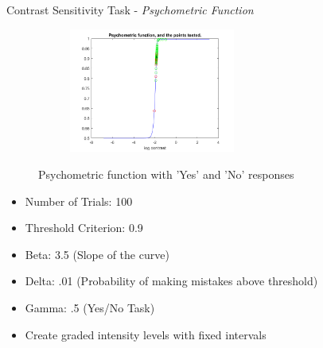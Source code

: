 \documentclass[10pt,xcolor=svgnames]{beamer} %
\begin{document}
\begin{frame}{Contrast Sensitivity Task - \textit{Psychometric Function}}
    \begin{figure}
        \centering
        \begin{figure}
        \centering
            \includegraphics[width=0.6\textwidth]{pictures/thrExp_PC.png}
        \end{figure}
        \hfill
        \label{fig:psychometric_func}
        \vspace{-0.7cm}
        \caption{Psychometric function with 'Yes' and 'No' responses}
    \end{figure}
    \vspace{-0.5cm}
    \begin{itemize}
    \small
        \item Number of Trials:	  100
        \item Threshold Criterion: 0.9
        \item Beta:		  3.5 (Slope of the curve)
        \item Delta\Lapse:	 .01 (Probability of making mistakes above threshold)
        \item Gamma:		 .5 (Yes/No Task)        
        \item Create graded intensity levels with fixed intervals    
    \end{itemize}
\end{frame}
\end{document}
